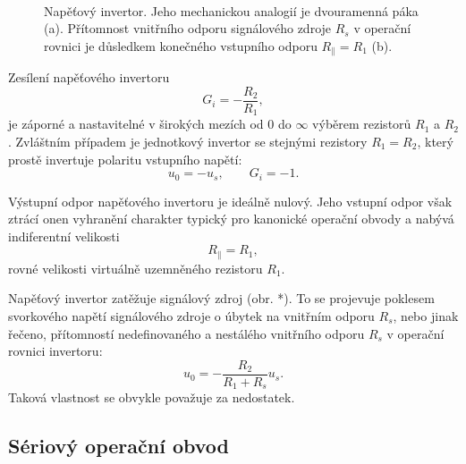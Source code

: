       \begin{figure}[ht!]
        \centering
          {}                                    \\
          {}             
        \caption{Napěťový invertor. Jeho mechanickou analogií je dvouramenná páka (a). Přítomnost 
                 vnitřního odporu signálového zdroje $R_s$ v operační rovnici je důsledkem 
                 konečného vstupního odporu $R_{\parallel} = R_1$ (b). }
        \label{aes:fig075}
      \end{figure}
      Zesílení napěťového invertoru 
      \begin{equation}\label{AES:eq_opamp_inv01}
        G_i = -\frac{R_2}{R_1},
      \end{equation} 
      je záporné a nastavitelné v širokých mezích od $0$ do $\infty$ výběrem rezistorů $R_1$ a 
      $R_2$. Zvláštním případem je jednotkový invertor se stejnými rezistory $R_1 = R_2$, který 
      prostě invertuje polaritu vstupního napětí: $$u_0 = - u_s, \qquad G_i = -1.$$
      
      Výstupní odpor napěťového invertoru je ideálně nulový. Jeho vstupní odpor však ztrácí onen 
      vyhranění charakter typický pro kanonické operační obvody a nabývá indiferentní velikosti 
      \begin{equation}\label{AES:eq_opamp_inv03}
        R_{\parallel} = R_1,
      \end{equation} 
      rovné velikosti virtuálně uzemněného rezistoru $R_1$.
      
      Napěťový invertor zatěžuje signálový zdroj (obr. *). To se projevuje poklesem svorkového 
      napětí signálového zdroje o úbytek na vnitřním odporu $R_s$, nebo jinak řečeno, přítomností 
      nedefinovaného a nestálého vnitřního odporu $R_s$ v operační rovnici invertoru:  
      \begin{equation}\label{AES:eq_opamp_inv04}
       u_0 = -\frac{R_2}{R_1 + R_s}u_s.
      \end{equation}      
      Taková vlastnost se obvykle považuje za nedostatek. 
            
    \subsection{Sériový operační obvod}
    

